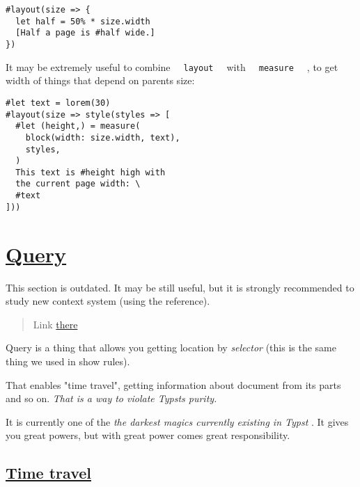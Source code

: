 \begin{verbatim}
#layout(size => {
  let half = 50% * size.width
  [Half a page is #half wide.]
})
\end{verbatim}

\pandocbounded{}

It may be extremely useful to combine
\texttt{\ }{\texttt{\ layout\ }}\texttt{\ } with
\texttt{\ }{\texttt{\ measure\ }}\texttt{\ } , to get width of things
that depend on parent\textquotesingle s size:

\begin{verbatim}
#let text = lorem(30)
#layout(size => style(styles => [
  #let (height,) = measure(
    block(width: size.width, text),
    styles,
  )
  This text is #height high with
  the current page width: \
  #text
]))
\end{verbatim}

\pandocbounded{}

\section{\texorpdfstring{\hyperref[query]{Query}}{Query}}\label{query}

This section is outdated. It may be still useful, but it is strongly
recommended to study new context system (using the reference).

\begin{quote}
Link \href{https://typst.app/docs/reference/meta/query/}{there}
\end{quote}

Query is a thing that allows you getting location by \emph{selector}
(this is the same thing we used in show rules).

That enables "time travel", getting information about document from its
parts and so on. \emph{That is a way to violate Typst\textquotesingle s
purity.}

It is currently one of the \emph{the darkest magics currently existing
in Typst} . It gives you great powers, but with great power comes great
responsibility.

\subsection{\texorpdfstring{\hyperref[time-travel]{Time
travel}}{Time travel}}\label{time-travel}

